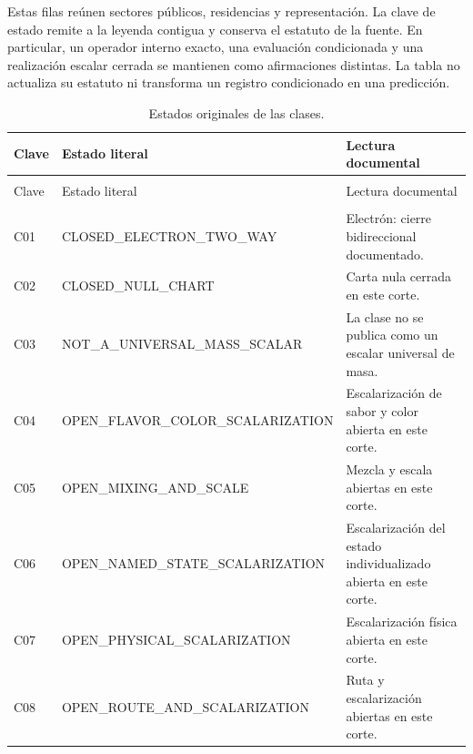 Estas filas reúnen sectores públicos, residencias y representación. La clave
de estado remite a la leyenda contigua y conserva el estatuto de la fuente.
En particular, un operador interno exacto, una evaluación condicionada y una
realización escalar cerrada se mantienen como afirmaciones distintas. La tabla
no actualiza su estatuto ni transforma un registro condicionado en una predicción.

\begingroup
\setlength{\tabcolsep}{4pt}
\setlength{\extrarowheight}{4pt}
\renewcommand{\arraystretch}{1.13}
\begin{longtable}{@{}>{\raggedright\arraybackslash}p{}>{\raggedright\arraybackslash}p{}>{\raggedright\arraybackslash}p{}@{}}
\caption{Estados originales de las clases.}\label{vi:tab:vi-estados-clases}\\
\toprule
Clave & Estado literal & Lectura documental \\
\midrule
\endfirsthead
\multicolumn{3}{l}{\textit{Continuación}}\\
\toprule
Clave & Estado literal & Lectura documental \\
\midrule
\endhead
\midrule
\multicolumn{3}{r}{Continúa en la página siguiente}\\
\endfoot
\bottomrule
\endlastfoot
C01 & CLOSED\_\allowbreak{}ELECTRON\_\allowbreak{}TWO\_\allowbreak{}WAY & Electrón: cierre bidireccional documentado. \\
C02 & CLOSED\_\allowbreak{}NULL\_\allowbreak{}CHART & Carta nula cerrada en este corte. \\
C03 & NOT\_\allowbreak{}A\_\allowbreak{}UNIVERSAL\_\allowbreak{}MASS\_\allowbreak{}SCALAR & La clase no se publica como un escalar universal de masa. \\
C04 & OPEN\_\allowbreak{}FLAVOR\_\allowbreak{}COLOR\_\allowbreak{}SCALARIZATION & Escalarización de sabor y color abierta en este corte. \\
C05 & OPEN\_\allowbreak{}MIXING\_\allowbreak{}AND\_\allowbreak{}SCALE & Mezcla y escala abiertas en este corte. \\
C06 & OPEN\_\allowbreak{}NAMED\_\allowbreak{}STATE\_\allowbreak{}SCALARIZATION & Escalarización del estado individualizado abierta en este corte. \\
C07 & OPEN\_\allowbreak{}PHYSICAL\_\allowbreak{}SCALARIZATION & Escalarización física abierta en este corte. \\
C08 & OPEN\_\allowbreak{}ROUTE\_\allowbreak{}AND\_\allowbreak{}SCALARIZATION & Ruta y escalarización abiertas en este corte. \\
\end{longtable}
\endgroup

